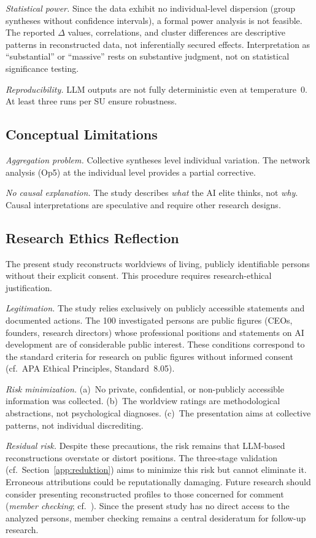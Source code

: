 \documentclass[12pt,a4paper]{article}
\begin{document}
\emph{Statistical power.} Since the data exhibit no individual-level dispersion (group syntheses without confidence intervals), a formal power analysis is not feasible. The reported $\Delta$ values, correlations, and cluster differences are descriptive patterns in reconstructed data, not inferentially secured effects. Interpretation as ``substantial'' or ``massive'' rests on substantive judgment, not on statistical significance testing.

\emph{Reproducibility.} LLM outputs are not fully deterministic even at temperature~0. At least three runs per SU ensure robustness.


\subsection{Conceptual Limitations}

\emph{Aggregation problem.} Collective syntheses level individual variation. The network analysis (Op5) at the individual level provides a partial corrective.

\emph{No causal explanation.} The study describes \emph{what} the AI elite thinks, not \emph{why}. Causal interpretations are speculative and require other research designs.

\subsection{Research Ethics Reflection}

The present study reconstructs worldviews of living, publicly identifiable persons without their explicit consent. This procedure requires research-ethical justification.

\emph{Legitimation.} The study relies exclusively on publicly accessible statements and documented actions. The 100 investigated persons are public figures (CEOs, founders, research directors) whose professional positions and statements on AI development are of considerable public interest. These conditions correspond to the standard criteria for research on public figures without informed consent (cf.\ APA Ethical Principles, Standard~8.05).

\emph{Risk minimization.} (a)~No private, confidential, or non-publicly accessible information was collected. (b)~The worldview ratings are methodological abstractions, not psychological diagnoses. (c)~The presentation aims at collective patterns, not individual discrediting.

\emph{Residual risk.} Despite these precautions, the risk remains that LLM-based reconstructions overstate or distort positions. The three-stage validation (cf.\ Section~\ref{app:reduktion}) aims to minimize this risk but cannot eliminate it. Erroneous attributions could be reputationally damaging. Future research should consider presenting reconstructed profiles to those concerned for comment (\textit{member checking}; cf.\ \citealt{SoysalTurkmen2024}). Since the present study has no direct access to the analyzed persons, member checking remains a central desideratum for follow-up research.
\end{document}
